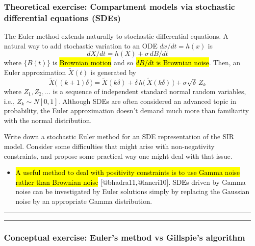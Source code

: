 \documentclass[]{article}
\providecommand{\tightlist}{%
  \setlength{\itemsep}{0pt}\setlength{\parskip}{0pt}}
\begin{document}
\subsubsection{Theoretical exercise: Compartment models via stochastic
differential equations
(SDEs)}\label{theoretical-exercise-compartment-models-via-stochastic-differential-equations-sdes}

The Euler method extends naturally to stochastic differential equations.
A natural way to add stochastic variation to an ODE \(dx/dt=h(x)\) is
\[ dX/dt = h(X) + \sigma \, dB/dt\] where \(\{B(t)\}\) is \hl{Brownian
motion} and so \hl{$dB/dt$ is Brownian noise}. Then, an Euler approximation
\(\tilde X(t)\) is generated by
\[ \tilde X\big( \,(k+1)\delta\,\big) = \tilde X( k\delta) + \delta\, h\big(\, \tilde X(k\delta)\,\big) + \sigma \sqrt{\delta} \, Z_k\]
where \(Z_1,Z_2,\dots\) is a sequence of independent standard normal
random variables, i.e., \(Z_k\sim N[0,1]\). Although SDEs are often
considered an advanced topic in probability, the Euler approximation
doesn't demand much more than familiarity with the normal distribution.

Write down a stochastic Euler method for an SDE representation of the
SIR model. Consider some difficulties that might arise with
non-negativity constraints, and propose some practical way one might
deal with that issue.

\begin{itemize}
\tightlist
\item
 \hl{ A useful method to deal with positivity constraints is to use Gamma
  noise rather than Brownian noise} {[}@bhadra11,@laneri10{]}. SDEs
  driven by Gamma noise can be investigated by Euler solutions simply by
  replacing the Gaussian noise by an appropriate Gamma distribution.
\end{itemize}

\begin{center}\rule{0.5\linewidth}{\linethickness}\end{center}

\begin{center}\rule{0.5\linewidth}{\linethickness}\end{center}

\subsubsection{Conceptual exercise: Euler's method vs Gillspie's
algorithm}\label{conceptual-exercise-eulers-method-vs-gillspies-algorithm}
\end{document}
